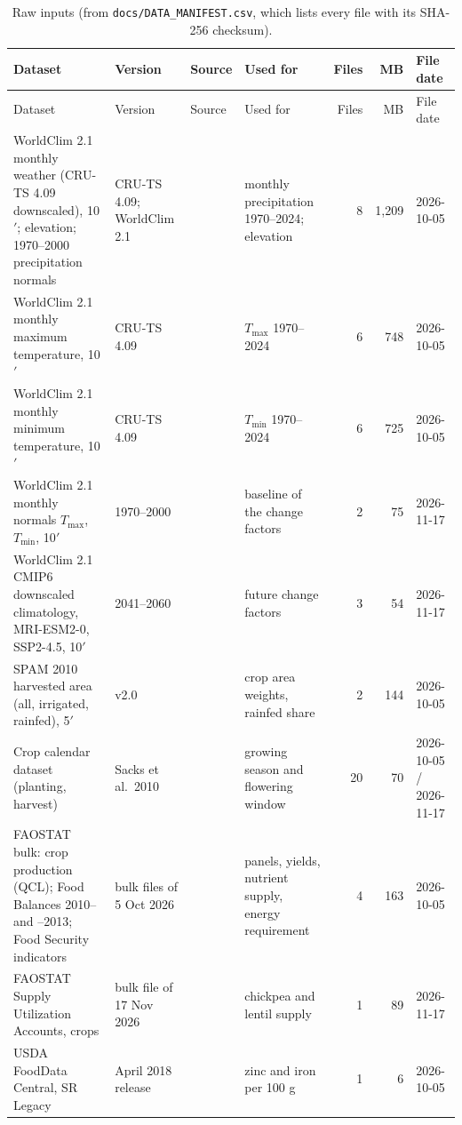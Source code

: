 {\scriptsize\begin{longtable}{L{0.275}L{0.131}L{0.137}L{0.191}rrL{0.096}}
\caption[Raw inputs]{Raw inputs (from \texttt{docs/DATA\_MANIFEST.csv}, which lists every file with its SHA-256 checksum).}\label{tab:datasources}\\
\toprule
Dataset & Version & Source & Used for & Files & MB & File date \\
\midrule\endfirsthead
\toprule
Dataset & Version & Source & Used for & Files & MB & File date \\
\midrule\endhead
\bottomrule\endfoot
WorldClim 2.1 monthly weather (CRU-TS 4.09 downscaled), 10$'$; elevation; 1970--2000 precipitation normals & CRU-TS 4.09; WorldClim 2.1 & \citet{fick2017,harris2020} & monthly precipitation 1970--2024; elevation & 8 & 1{,}209 & 2026-10-05 \\
WorldClim 2.1 monthly maximum temperature, 10$'$ & CRU-TS 4.09 & \citet{fick2017,harris2020} & $T_{\max}$ 1970--2024 & 6 & 748 & 2026-10-05 \\
WorldClim 2.1 monthly minimum temperature, 10$'$ & CRU-TS 4.09 & \citet{fick2017,harris2020} & $T_{\min}$ 1970--2024 & 6 & 725 & 2026-10-05 \\
WorldClim 2.1 monthly normals $T_{\max}$, $T_{\min}$, 10$'$ & 1970--2000 & \citet{fick2017} & baseline of the change factors & 2 & 75 & 2026-11-17 \\
WorldClim 2.1 CMIP6 downscaled climatology, MRI-ESM2-0, SSP2-4.5, 10$'$ & 2041--2060 & \citet{wcmip6} & future change factors & 3 & 54 & 2026-11-17 \\
SPAM 2010 harvested area (all, irrigated, rainfed), 5$'$ & v2.0 & \citet{spam2010} & crop area weights, rainfed share & 2 & 144 & 2026-10-05 \\
Crop calendar dataset (planting, harvest) & Sacks et al.\ 2010 & \citet{sacks2010} & growing season and flowering window & 20 & 70 & 2026-10-05 / 2026-11-17 \\
FAOSTAT bulk: crop production (QCL); Food Balances 2010-- and --2013; Food Security indicators & bulk files of 5 Oct 2026 & \citet{faostat} & panels, yields, nutrient supply, energy requirement & 4 & 163 & 2026-10-05 \\
FAOSTAT Supply Utilization Accounts, crops & bulk file of 17 Nov 2026 & \citet{faosua} & chickpea and lentil supply & 1 & 89 & 2026-11-17 \\
USDA FoodData Central, SR Legacy & April 2018 release & \citet{usda2019} & zinc and iron per 100 g & 1 & 6 & 2026-10-05 \\

\end{longtable}}
